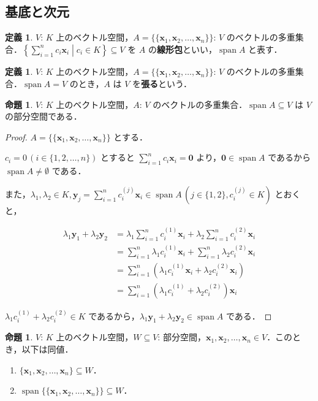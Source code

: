 \documentclass{jlreq}
\theoremstyle{definition}
\newtheorem{dfn}[thm]{定義}
\newtheorem{prop}[thm]{命題}
\newcommand{\relmiddle}[1]{\mathrel{}\middle#1\mathrel{}}
\DeclareMathOperator{\Span}{span}
\begin{document}
    \subsection{基底と次元}
      \begin{dfn}
        $V$: $K$ 上のベクトル空間，$A=\{\{\bm{x}_1, \bm{x}_2, \dots, \bm{x}_n\}\}$: $V$ のベクトルの多重集合．$\left\{\sum_{i=1}^n c_i\bm{x}_i \relmiddle| c_i \in K \right\} \subseteq V$ を $A$ の\textbf{線形包}といい，$\Span A$ と表す．
      \end{dfn}
      \begin{dfn}
        $V$: $K$ 上のベクトル空間，$A=\{\{\bm{x}_1, \bm{x}_2, \dots, \bm{x}_n\}\}$: $V$ のベクトルの多重集合．$\Span A = V$ のとき，$A$ は $V$ を\textbf{張る}という．
      \end{dfn}
      \begin{prop}
        $V$: $K$ 上のベクトル空間，$A$: $V$ のベクトルの多重集合．$\Span A \subseteq V$ は $V$ の部分空間である．
      \end{prop}
      \begin{proof}
        $A=\{\{\bm{x}_1, \bm{x}_2, \dots, \bm{x}_n\}\}$ とする．
        
        $c_i = 0 \, (i \in \{1, 2, \dots, n\})$ とすると $\sum_{i=1}^n c_i\bm{x}_i = \bm{0}$ より，$\bm{0} \in \Span A$ であるから $\Span A \neq \emptyset$ である．

        また，$\lambda_1, \lambda_2 \in K, \bm{y}_j=\sum_{i=1}^n c_i^{(j)}\bm{x}_i \in \Span A \, (j \in \{1,2\}, c_i^{(j)} \in K)$ とおくと，

        \begin{align*}
          \lambda_1\bm{y}_1+\lambda_2\bm{y}_2 &= \lambda_1 \sum_{i=1}^n c_i^{(1)}\bm{x}_i+\lambda_2 \sum_{i=1}^n c_i^{(2)}\bm{x}_i \\
          &= \sum_{i=1}^n \lambda_1c_i^{(1)}\bm{x}_i + \sum_{i=1}^n \lambda_2c_i^{(2)}\bm{x}_i \\
          &= \sum_{i=1}^n\left(\lambda_1c_i^{(1)}\bm{x}_i+\lambda_2c_i^{(2)}\bm{x}_i\right) \\
          &= \sum_{i=1}^n\left(\lambda_1c_i^{(1)}+\lambda_2c_i^{(2)}\right)\bm{x}_i
        \end{align*}

        $\lambda_1c_i^{(1)}+\lambda_2c_i^{(2)} \in K$ であるから，$\lambda_1\bm{y}_1+\lambda_2\bm{y}_2 \in \Span A$ である．
      \end{proof}
      \begin{prop}\label{property-span-and-subspace}
        $V$: $K$ 上のベクトル空間，$W \subseteq V$: 部分空間，$\bm{x}_1, \bm{x}_2, \dots, \bm{x}_n \in V$．このとき，以下は同値．
        \begin{enumerate}
          \item $\{\bm{x}_1, \bm{x}_2, \dots, \bm{x}_n\} \subseteq W$．
          \item $\Span \{\{\bm{x}_1, \bm{x}_2, \dots, \bm{x}_n\}\} \subseteq W$．
        \end{enumerate}
      \end{prop}
\end{document}
